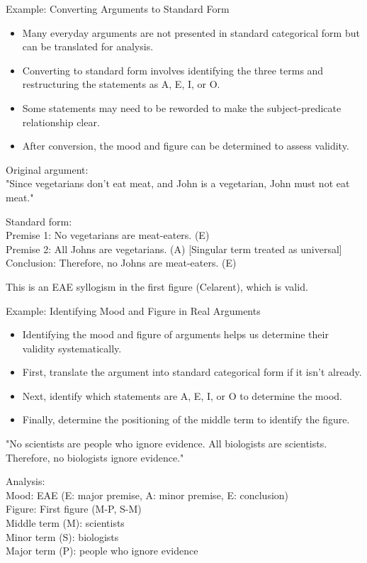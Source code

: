 \documentclass{beamer}
\begin{document}
	\begin{frame}{Example: Converting Arguments to Standard Form}
		\begin{itemize}
			\item Many everyday arguments are not presented in standard categorical form but can be translated for analysis.
			\item Converting to standard form involves identifying the three terms and restructuring the statements as A, E, I, or O.
			\item Some statements may need to be reworded to make the subject-predicate relationship clear.
			\item After conversion, the mood and figure can be determined to assess validity.
		\end{itemize}
		
		\begin{example}
			\scriptsize
			Original argument:\\
			"Since vegetarians don't eat meat, and John is a vegetarian, John must not eat meat."
			
			Standard form:\\
			Premise 1: No vegetarians are meat-eaters. (E)\\
			Premise 2: All Johns are vegetarians. (A) [Singular term treated as universal]\\
			Conclusion: Therefore, no Johns are meat-eaters. (E)
			
			This is an EAE syllogism in the first figure (Celarent), which is valid.
		\end{example}
	\end{frame}
	
	\begin{frame}{Example: Identifying Mood and Figure in Real Arguments}
		\begin{itemize}
			\item Identifying the mood and figure of arguments helps us determine their validity systematically.
			\item First, translate the argument into standard categorical form if it isn't already.
			\item Next, identify which statements are A, E, I, or O to determine the mood.
			\item Finally, determine the positioning of the middle term to identify the figure.
		\end{itemize}
		
		\begin{example}
			\scriptsize
			"No scientists are people who ignore evidence. All biologists are scientists. Therefore, no biologists ignore evidence."
			
			Analysis:\\
			Mood: EAE (E: major premise, A: minor premise, E: conclusion)\\
			Figure: First figure (M-P, S-M)\\
			Middle term (M): scientists\\
			Minor term (S): biologists\\
			Major term (P): people who ignore evidence
		\end{example}
	\end{frame}
	
\end{document}
